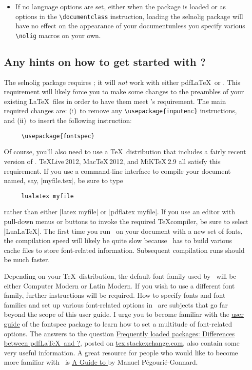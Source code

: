 \documentclass[12pt]{article}
\newcommand{\pkg}[1]{\textsf{#1}}
\newcommand{\cmmd}[1]{\texttt{\textbackslash #1}}
\begin{document}
\begin{itemize}
\item If no language options are set, either when the package is loaded or as options in the \cmmd{documentclass} instruction, loading the \pkg{selnolig} package will have no effect on the appearance of your document\textemdash unless you specify various \cmmd{nolig} macros on your own.
\end{itemize}


\subsection{Any hints on how to get started with \LuaLaTeX?}

The \pkg{selnolig} package requires \LuaLaTeX; it will \emph{not} work with either pdf\LaTeX\ or \XeLaTeX. This requirement will likely force you to make some changes to the preambles of your existing \LaTeX\ files in order to have them meet \LuaLaTeX's requirement. The main required changes are: (i)~to remove any \Verb+\usepackage{inputenc}+ instructions, and (ii)~to insert the following instruction:
\begin{Verbatim}
     \usepackage{fontspec}
\end{Verbatim}

Of course, you'll also need to use a \TeX\ distribution that includes a fairly recent version of \LuaLaTeX. \TeX Live\,2012, Mac\TeX\,2012, and MiK\TeX\,2.9 all satisfy this requirement. If you use a command-line interface to compile your document named, say, |myfile.tex|, be sure to type 
\begin{Verbatim}
     lualatex myfile
\end{Verbatim}
rather than either |latex myfile| or |pdflatex myfile|. If you use an editor with pull-down menus or buttons to invoke the required \TeX compiler, be sure to select |LuaLaTeX|. The first time you run \LuaLaTeX\ on your document with a new set of fonts, the compilation speed will likely be quite slow because \LuaLaTeX\ has to build various cache files to store font-related information. Subsequent compilation runs should be much faster. 

Depending on your \TeX\ distribution, the default font family used by \LuaLaTeX\ will be either Computer Modern or Latin Modern. If you wish to use a different font family, further instructions will be required. How to specify fonts and font families and set up various font-related options in \LuaLaTeX\ are subjects that go far beyond the scope of this user guide. I urge you to become familiar with the \href{http://www.ctan.org/tex-archive/macros/latex/contrib/fontspec/fontspec.pdf}{user guide} of the \pkg{fontspec} package to learn how to set a multitude of font-related options. The answers to the question \href{http://tex.stackexchange.com/q/28642/5001}{Frequently loaded packages: Differences between pdf\LaTeX\ and \LuaLaTeX?}, posted on \href{http://tex.stackexchange.com/}{tex.s\breaklig tackexchange.com}, also contain some very useful information. A great resource for people who would like to become more familiar with \LuaLaTeX\ is  \href{http://mirror.ctan.org/info/luatex/lualatex-doc/lualatex-doc.pdf}{A Guide to \LuaLaTeX} by Manuel Pégourié-Gonnard.
\end{document}
